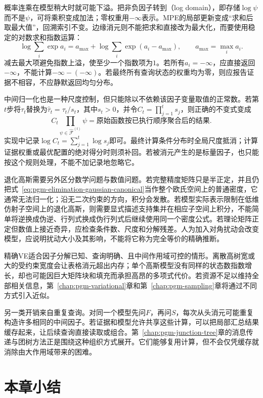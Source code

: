 概率连乘在模型稍大时就可能下溢。把非负因子转到（log domain），即存储$\log\psi$而不是$\psi$，可将乘积变成加法；零权重用$-\infty$表示。MPE的局部更新变成“求和后取最大值”，回溯索引不变。边缘消元则不能把求和直接改为最大化，而要使用稳定的对数求和指数运算：
\begin{equation}
  \log\sum_i\exp a_i
  =a_{\max}+\log\sum_i\exp(a_i-a_{\max}),
  \qquad a_{\max}=\max_i a_i.
  \label{eq:pgm-elimination-logsumexp}
\end{equation}
减去最大项避免指数上溢，使至少一个指数项为$1$。若所有$a_i=-\infty$，应直接返回$-\infty$，不能计算$-\infty-(-\infty)$。若最终所有查询状态的权重均为零，则应报告证据不相容，不应静默返回均匀分布。

中间归一化也是一种尺度控制，但只能除以不依赖该因子变量取值的正常数。若第$t$步将$\tau_t$替换为$\widehat{\tau}_t=\tau_t/s_t$，其中$s_t>0$，并令$C_t=\prod_{j=1}^t s_j$，则正确的不变式变成
\[
  C_t\prod_{\psi\in\widehat{\mathcal{F}}^{(t)}}\psi
  =\text{原始函数按已执行顺序聚合后的结果}.
\]
实现中记录$\log C_t=\sum_{j=1}^t\log s_j$即可。最终计算条件分布时全局尺度抵消；计算证据权重或最优配置的绝对得分时则须补回。若被消元产生的是标量因子，也只能按这个规则处理，不能不加记录地忽略它。

退化高斯需要另外区分数学问题与数值问题。若完整精度矩阵只是半正定，并且仍把式~\eqref{eq:pgm-elimination-gaussian-canonical}当作整个欧氏空间上的普通密度，它通常无法归一化；沿无二次约束的方向，积分会发散。若模型实际表示限制在低维仿射子空间上的退化高斯，则需要显式描述支持集并在相应子空间上积分，不能简单将逆换成伪逆、行列式换成伪行列式后继续使用同一个密度公式。若理论矩阵正定但数值上接近奇异，应检查条件数、尺度和分解残差。人为加入对角扰动会改变模型，应说明扰动大小及其影响，不能将它称为完全等价的精确推断。

精确VE适合因子分解已知、查询明确、且中间作用域可控的情形。离散高树宽或大的受约束宽度会让表格消元超出内存；单个高斯模型没有同样的状态数指数增长，却也可能因巨大矩阵块和填充而承担高昂的多项式代价。若资源不足以维持全部相关信息，第~\ref{chap:pgm-variational}章和第~\ref{chap:pgm-sampling}章将通过不同方式引入近似。

另一类开销来自重复查询。对同一个模型先问$F$，再问$S$，每次从头消元可能重复构造许多相同的中间因子。若证据和模型允许共享这些计算，可以把局部汇总结果缓存起来，让后续查询直接读取或组合。第~\ref{chap:pgm-junction-tree}章的消息传递与团树方法正是围绕这种组织方式展开。它们能够复用计算，但不会仅凭缓存就消除由大作用域带来的困难。

\section{本章小结}
\label{sec:pgm-elimination-summary}

